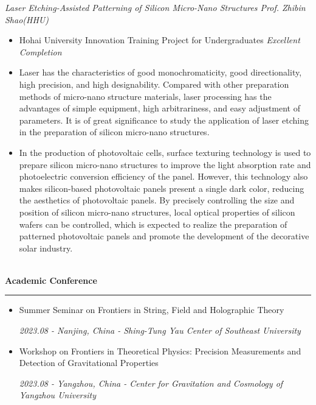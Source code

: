 \documentclass[12pt]{article}
\renewcommand*{\section}[1]{
    ~\\ \noindent \textbf{#1} \medskip \hrule \medskip
}
\begin{document}
\quad \textit{Laser Etching-Assisted Patterning of Silicon Micro-Nano Structures \hfill Prof. Zhibin Shao(HHU)}

\begin{itemize}[noitemsep,nolistsep]
    \item Hohai University Innovation Training Project for Undergraduates \textit{Excellent Completion}
    \item Laser has the characteristics of good monochromaticity, good directionality, high precision, and high designability. Compared with other preparation methods of micro-nano structure materials, laser processing has the advantages of simple equipment, high arbitrariness, and easy adjustment of parameters. It is of great significance to study the application of laser etching in the preparation of silicon micro-nano structures.
    \item In the production of photovoltaic cells, surface texturing technology is used to prepare silicon micro-nano structures to improve the light absorption rate and photoelectric conversion efficiency of the panel. However, this technology also makes silicon-based photovoltaic panels present a single dark color, reducing the aesthetics of photovoltaic panels. By precisely controlling the size and position of silicon micro-nano structures, local optical properties of silicon wafers can be controlled, which is expected to realize the preparation of patterned photovoltaic panels and promote the development of the decorative solar industry.
\end{itemize}


\section{Academic Conference}

\begin{itemize}[noitemsep,nolistsep]
    \item Summer Seminar on Frontiers in String, Field and Holographic Theory

    \hfill \textit{2023.08 - Nanjing, China - Shing-Tung Yau Center of Southeast University}
    \item Workshop on Frontiers in Theoretical Physics: Precision Measurements and Detection of Gravitational Properties

    \hfill \textit{2023.08 - Yangzhou, China - Center for Gravitation and Cosmology of Yangzhou University}
\end{itemize}
\end{document}
